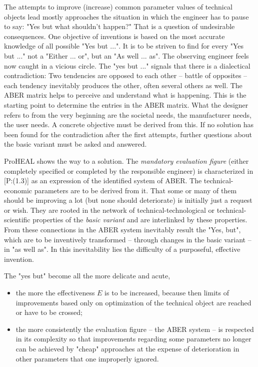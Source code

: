 \documentclass[11pt,a4paper]{article}
\begin{document}
The attempts to improve (increase) common parameter values of technical
objects lead mostly approaches the situation in which the engineer has to
pause to say: "Yes but what shouldn't happen?" That is a question of
undesirable consequences. One objective of inventions is based on the most
accurate knowledge of all possible "Yes but ...". It is to be striven to find
for every "Yes but ..."  not a "Either ... or", but an "As well ... as". The
observing engineer feels now caught in a vicious circle. The "yes but ..."
signals that there is a dialectical contradiction: Two tendencies are opposed
to each other -- battle of opposites -- each tendency inevitably produces the
other, often several others as well. The ABER matrix helps to perceive and
understand what is happening. This is the starting point to determine the
entries in the ABER matrix. What the designer refers to from the very
beginning are the societal needs, the manufacturer needs, the user needs. A
concrete objective must be derived from this.  If no solution has been found
for the contradiction after the first attempts, further questions about the
basic variant must be asked and answered.

ProHEAL shows the way to a solution. The \emph{mandatory evaluation figure}
(either completely specified or completed by the responsible engineer) is
characterized in [P:(1.3)] as an expression of the identified system of ABER.
The technical-economic parameters are to be derived from it. That some or many
of them should be improving a lot (but none should deteriorate) is initially
just a request or wish. They are rooted in the network of
technical-technological or technical-scientific properties of the \emph{basic
  variant} and are interlinked by these properties. From these connections in
the ABER system inevitably result the "Yes, but", which are to be inventively
transformed -- through changes in the basic variant -- in "as well as". In
this inevitability lies the difficulty of a purposeful, effective invention.

The "yes but" become all the more delicate and acute, 
\begin{itemize}
\item the more the effectiveness $E$ is to be increased, because then limits
  of improvements based only on optimization of the technical object are
  reached or have to be crossed;
\item the more consistently the evaluation figure -- the ABER system -- is
  respected in its complexity so that improvements regarding some parameters
  no longer can be achieved by "cheap" approaches at the expense of
  deterioration in other parameters that one improperly ignored.
\end{itemize}
\end{document}
